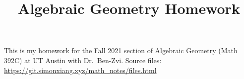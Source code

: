 \documentclass[fontsize=9pt]{article}
\title{Algebraic Geometry Homework}
\date{}
\begin{document}
\maketitle
This is my homework for the Fall 2021 section of Algebraic Geometry (Math 392C) at UT Austin with Dr.\ Ben-Zvi. Source files: \url{https://git.simonxiang.xyz/math_notes/files.html} 
\tableofcontents
\end{document}
